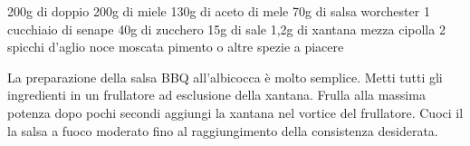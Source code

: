 \label{salsa-bbq}
\serves{-}
\begin{ingreds}
	200g di doppio 
	200g di miele
	130g di aceto di mele
	70g di salsa worchester
	1 cucchiaio di senape
	40g di zucchero
	15g di sale
	1,2g di xantana
	mezza cipolla
	2 spicchi d'aglio
	noce moscata
	pimento o altre spezie a piacere

\end{ingreds}

\begin{method}
La preparazione della salsa BBQ all'albicocca è molto semplice. Metti tutti gli ingredienti in un frullatore ad esclusione della xantana. Frulla alla massima potenza dopo pochi secondi aggiungi la xantana nel vortice del frullatore.
Cuoci il la salsa a fuoco moderato fino al raggiungimento della consistenza desiderata.
\end{method}



